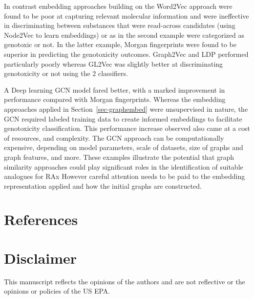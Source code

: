 \documentclass[
  super,
  preprint,
  3p]{elsarticle}
\begin{document}
In contrast embedding approaches building on the Word2Vec approach were
found to be poor at capturing relevant molecular information and were
ineffective in discriminating between substances that were read-across
candidates (using Node2Vec to learn embeddings) or as in the second
example were categorized as genotoxic or not. In the latter example,
Morgan fingerprints were found to be superior in predicting the
genotoxicity outcomes. Graph2Vec and LDP performed particularly poorly
whereas GL2Vec was slightly better at discriminating genotoxicity or not
using the 2 classifiers.

A Deep learning GCN model fared better, with a marked improvement in
performance compared with Morgan fingerprints. Whereas the embedding
approaches applied in Section~\ref{sec-graphembed} were unsupervised in
nature, the GCN required labeled training data to create informed
embeddings to facilitate genotoxicity classification. This performance
increase observed also came at a cost of resources, and complexity. The
GCN approach can be computationally expensive, depending on model
parameters, scale of datasets, size of graphs and graph features, and
more. These examples illustrate the potential that graph similarity
approaches could play significant roles in the identification of
suitable analogues for RAx However careful attention needs to be paid to
the embedding representation applied and how the initial graphs are
constructed.

\section*{References}\label{references}

\section*{Disclaimer}\label{disclaimer}

This manuscript reflects the opinions of the authors and are not
reflective or the opinions or policies of the US EPA.


  
\end{document}
